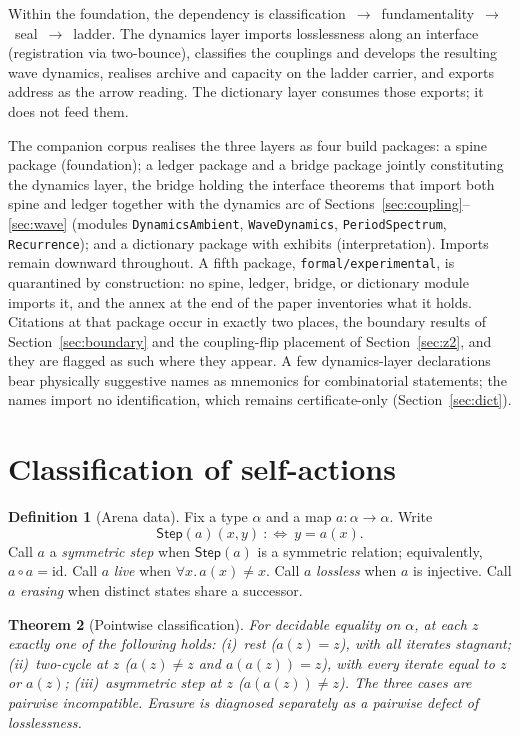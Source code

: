 \documentclass[11pt,a4paper]{article}
\theoremstyle{plain}
\newtheorem{theorem}{Theorem}[section]
\theoremstyle{definition}
\newtheorem{definition}[theorem]{Definition}
\theoremstyle{remark}
\newcommand{\comp}{\circ}
\begin{document}
\noindent
Within the foundation, the dependency is
classification~$\to$~fundamentality~$\to$~seal~$\to$~ladder.
The dynamics layer imports losslessness along an interface
(registration via two-bounce), classifies the couplings and develops the
resulting wave dynamics, realises archive and capacity on the ladder
carrier, and exports address as the arrow reading. The dictionary
layer consumes those exports; it does not feed them.

The companion corpus realises the three layers as four build packages:
a spine package (foundation); a ledger package and a bridge package
jointly constituting the dynamics layer, the bridge holding the
interface theorems that import both spine and ledger together with the
dynamics arc of Sections~\ref{sec:coupling}--\ref{sec:wave}
(modules \texttt{DynamicsAmbient}, \texttt{WaveDynamics},
\texttt{PeriodSpectrum}, \texttt{Recurrence}); and a dictionary
package with exhibits (interpretation). Imports remain downward
throughout. A fifth package, \texttt{formal/experimental}, is
quarantined by construction: no spine, ledger, bridge, or dictionary
module imports it, and the annex at the end of the paper inventories
what it holds. Citations at that package occur in exactly two places,
the boundary results of Section~\ref{sec:boundary} and the
coupling-flip placement of Section~\ref{sec:z2}, and they are flagged
as such where they appear. A few dynamics-layer
declarations bear physically suggestive names as mnemonics for
combinatorial statements; the names import no identification, which
remains certificate-only (Section~\ref{sec:dict}).


\section{Classification of self-actions}
\label{sec:class}

\begin{definition}[Arena data]
\label{def:arena}
Fix a type $\alpha$ and a map $a:\alpha\to\alpha$. Write
\[
  \mathsf{Step}(a)(x,y)\ :\Leftrightarrow\ y=a(x).
\]
Call $a$ a \emph{symmetric step} when $\mathsf{Step}(a)$ is a symmetric
relation; equivalently, $a\comp a=\mathrm{id}$. Call $a$ \emph{live}
when $\forall x.\, a(x)\neq x$. Call $a$ \emph{lossless} when $a$ is
injective. Call $a$ \emph{erasing} when distinct states share a
successor.
\end{definition}

\begin{theorem}[Pointwise classification]
\label{thm:class}
For decidable equality on $\alpha$, at each $z$ exactly one of the
following holds: (i)~rest ($a(z)=z$), with all iterates stagnant;
(ii)~two-cycle at $z$ ($a(z)\neq z$ and $a(a(z))=z$), with every iterate
equal to $z$ or $a(z)$; (iii)~asymmetric step at $z$ ($a(a(z))\neq z$).
The three cases are pairwise incompatible. Erasure is diagnosed
separately as a pairwise defect of losslessness.
\end{theorem}
\end{document}
